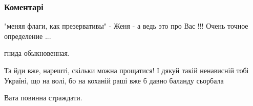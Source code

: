  
 
 
 
 
\subsubsection{Коментарі}

\begin{itemize} %
"меняя флаги, как презервативы" - Женя - а ведь это про Вас !!! Очень точное определение ...

гнида обыкновенная.

Та йди вже, нарешті, скільки можна прощатися! І дякуй такій ненависній тобі Україні, що на волі, бо на коханій раші вже б давно баланду сьорбала

Вата повинна страждати.
\end{itemize} %
